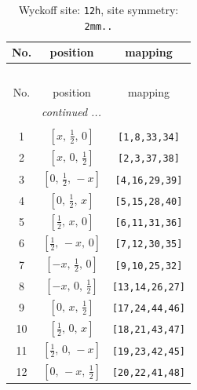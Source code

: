 \documentclass[fleqn,8pt]{jsarticle}
\begin{document}
\begin{longtable}{ccc}
\caption{Wyckoff site: {\tt 12h}, site symmetry: {\tt 2mm..}}
 \\
 \hline \hline
No. & position & mapping \\ \hline \endfirsthead

\multicolumn{2}{l}{\tablename\ \thetable{}} \\
 \hline \hline
No. & position & mapping \\ \hline \endhead

 \hline \hline
\multicolumn{2}{r}{\footnotesize\it continued ...} \\ \endfoot

 \hline \hline
\multicolumn{2}{r}{} \\ \endlastfoot

1 & $\left[ x,\, \frac{1}{2},\, 0 \right]$ & {\tt [1,8,33,34]} \\ \hline
2 & $\left[ x,\, 0,\, \frac{1}{2} \right]$ & {\tt [2,3,37,38]} \\ \hline
3 & $\left[ 0,\, \frac{1}{2},\, - x \right]$ & {\tt [4,16,29,39]} \\ \hline
4 & $\left[ 0,\, \frac{1}{2},\, x \right]$ & {\tt [5,15,28,40]} \\ \hline
5 & $\left[ \frac{1}{2},\, x,\, 0 \right]$ & {\tt [6,11,31,36]} \\ \hline
6 & $\left[ \frac{1}{2},\, - x,\, 0 \right]$ & {\tt [7,12,30,35]} \\ \hline
7 & $\left[ - x,\, \frac{1}{2},\, 0 \right]$ & {\tt [9,10,25,32]} \\ \hline
8 & $\left[ - x,\, 0,\, \frac{1}{2} \right]$ & {\tt [13,14,26,27]} \\ \hline
9 & $\left[ 0,\, x,\, \frac{1}{2} \right]$ & {\tt [17,24,44,46]} \\ \hline
10 & $\left[ \frac{1}{2},\, 0,\, x \right]$ & {\tt [18,21,43,47]} \\ \hline
11 & $\left[ \frac{1}{2},\, 0,\, - x \right]$ & {\tt [19,23,42,45]} \\ \hline
12 & $\left[ 0,\, - x,\, \frac{1}{2} \right]$ & {\tt [20,22,41,48]} \\
\end{longtable}
\renewcommand{\arraystretch}{1.2}
\end{document}
